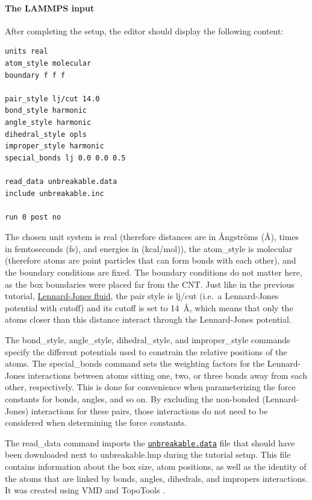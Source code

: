 \documentclass[9pt,tutorial]{livecoms}
\newcommand{\lmpcmd}[1]{\hspace{0pt}\colorbox{listing}{\textcolor{command}{\small{#1}}}\hspace{0pt}} %
\newcommand{\dwlcmd}[1]{\textcolor{download}{\texttt{#1}}} %
\newcommand{\filepath}{https://raw.githubusercontent.com/lammpstutorials/lammpstutorials-article/main/files/}
\begin{document}
\paragraph{The LAMMPS input}

After completing the setup, the editor should display the following content:
\begin{lstlisting}
units real
atom_style molecular
boundary f f f

pair_style lj/cut 14.0
bond_style harmonic
angle_style harmonic
dihedral_style opls
improper_style harmonic
special_bonds lj 0.0 0.0 0.5

read_data unbreakable.data
include unbreakable.inc

run 0 post no
\end{lstlisting}
The chosen unit system is \lmpcmd{real} (therefore distances are in
Ångströms (Å), times in femtoseconds (fs), and energies in (kcal/mol)), the
\lmpcmd{atom\_style} is \lmpcmd{molecular} (therefore atoms are point
particles that can form bonds with each other), and the boundary
conditions are fixed.  The boundary conditions do not matter here, as
the box boundaries were placed far from the CNT.  Just like in the
previous tutorial, \hyperref[lennard-jones-label]{Lennard-Jones fluid},
the pair style is \lmpcmd{lj/cut} (i.e.~a Lennard-Jones potential with
cutoff) and its cutoff is set to 14~Å, which means that only the
atoms closer than this distance interact through the Lennard-Jones
potential.

The \lmpcmd{bond\_style}, \lmpcmd{angle\_style},
\lmpcmd{dihedral\_style}, and \lmpcmd{improper\_style} commands specify
the different potentials used to constrain the relative positions of the
atoms.  The \lmpcmd{special\_bonds} command sets the weighting factors
for the Lennard-Jones interactions {\color{blue}between atoms sitting one,
two, or three bonds away from each other, respectively.}  This is done for
convenience when parameterizing the force constants for bonds, angles, and
so on.  By excluding the non-bonded (Lennard-Jones) interactions for
these pairs, those interactions do not need to be considered when determining
the force constants.

The \lmpcmd{read\_data} command imports the
\href{\filepath tutorial2/unbreakable.data}{\dwlcmd{unbreakable.data}}
file that should have been downloaded next
to \lmpcmd{unbreakable.lmp} during the tutorial setup. This file
contains information about the box size, atom positions, as well as the
identity of the atoms that are
linked by \lmpcmd{bonds}, \lmpcmd{angles}, \lmpcmd{dihedrals}, and
\lmpcmd{impropers} interactions. It was created using VMD and TopoTools
\cite{kohlmeyer2017topotools}.
\end{document}
